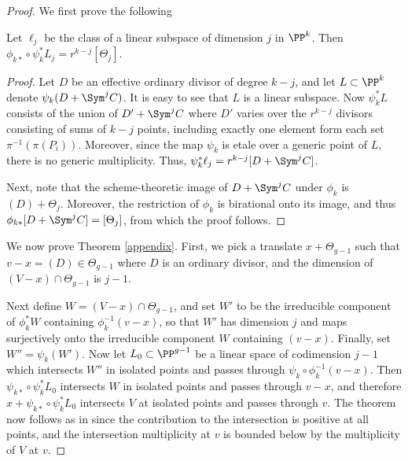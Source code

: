 \begin{proof}

We first prove the following

\begin{lemma}
\notready

Let $\ell_j$ be the class of a linear subspace of dimension $j$ in $\PP^k$. Then $\phi_{k*}\circ\psi_k^*L_j = r^{k-j} [\Theta_j]$.

\end{lemma}

\begin{proof}

Let $D$ be an effective ordinary divisor of degree $k-j$, and let $L\subset\PP^k$ denote
$\psi_k(D+\Sym^j C)$. It is easy to see that $L$ is a linear subspace. Now $\psi_k^*L$ consists of the union of $D'+\Sym^jC$ where $D'$ varies over the $r^{k-j}$ divisors
consisting of  sums of $k-j$ points, including exactly one element form each set $\pi^{-1}(\pi(P_i))$. Moreover, since the map $\psi_k$ is etale over a generic point
of $L$, there is no generic multiplicity. Thus, $\psi_k^*\ell_j = r^{k-j} [D+\Sym^j C]$.

Next, note that the scheme-theoretic image of $D+\Sym^jC$ under $\phi_k$ is  $(D) + \Theta_j$. Moreover, the restriction of $\phi_k$  is birational onto its image, and thus
$\phi_{k*}[D+\Sym^jC] = [\Theta_j]$, from which the proof follows.

\end{proof}

We now prove Theorem \ref{appendix}. First, we pick a translate $x+\Theta_{g-1}$ such that $v-x=(D)\in\Theta_{g-1}$ where $D$ is an ordinary divisor, and the dimension of $(V-x)\cap \Theta_{g-1}$ is $j-1$.

Next define $W=(V-x)\cap\Theta_{g-1}$, and set $W'$ to be the irreducible component of $\phi_k^* W$ containing $\phi_k^{-1}(v-x)$, so that $W'$ has dimension $j$ and maps surjectively onto the irreducible component $W$ containing $(v-x)$. Finally, set $W'' = \psi_k(W')$. Now let $L_0\subset \PP^{g-1}$ be a linear space of codimension $j-1$ which intersects $W''$ in isolated points and passes through
$\psi_k\circ\phi_k^{-1}(v-x)$.
Then $\psi_{k*}\circ\psi_k^*L_0$ intersects $W$ in isolated points and passes through $v-x$, and therefore $x+\psi_{k*}\circ\psi_k^*L_0$ intersects $V$ at isolated points and passes
through $v$. The theorem now follows as in \citep[Proposition 3.25]{TS} since the contribution to the intersection is positive at all points, and the intersection multiplicity at $v$ is bounded below by the multiplicity of $V$ at $v$.



\end{proof}
